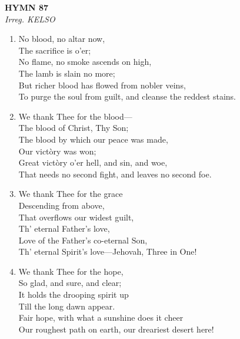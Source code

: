 \newpage
\begin{center}
    {\Large \textbf{HYMN 87}}
    \\
    \textit{Irreg. KELSO}
\end{center}
\vspace{1em}

\begin{enumerate}
    \item No blood, no altar now, \\
        The sacrifice is o'er; \\
        No flame, no smoke ascends on high, \\
        The lamb is slain no more; \\
        But richer blood has flowed from nobler veins, \\
        To purge the soul from guilt, and cleanse the reddest stains.

    \item We thank Thee for the blood--- \\
        The blood of Christ, Thy Son; \\
        The blood by which our peace was made, \\
        Our vict\`ory was won; \\
        Great vict\`ory o'er hell, and sin, and woe, \\
        That needs no second fight, and leaves no second foe.

    \item We thank Thee for the grace \\
        Descending from above, \\
        That overflows our widest guilt, \\
        Th' eternal Father's love, \\
        Love of the Father's co-eternal Son, \\
        Th' eternal Spirit's love---Jehovah, Three in One!

    \item We thank Thee for the hope, \\
        So glad, and sure, and clear; \\
        It holds the drooping spirit up \\
        Till the long dawn appear. \\
        Fair hope, with what a sunshine does it cheer \\
        Our roughest path on earth, our dreariest desert here!

\end{enumerate}

